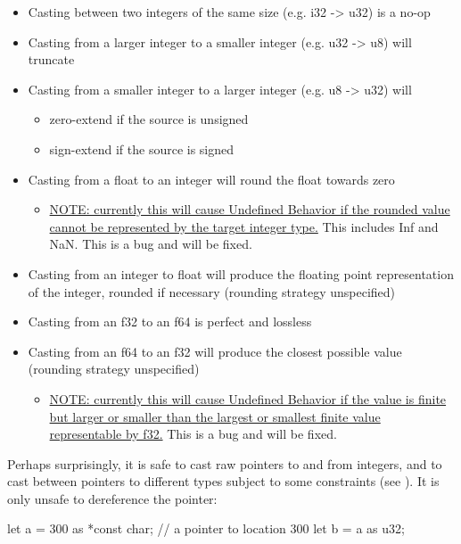 \begin{itemize}
  \item{Casting between two integers of the same size (e.g. i32 -> u32) is a no-op}
  \item{Casting from a larger integer to a smaller integer (e.g. u32 -> u8) will truncate}
  \item{Casting from a smaller integer to a larger integer (e.g. u8 -> u32) will}
  \begin{itemize}
    \item{zero-extend if the source is unsigned}
    \item{sign-extend if the source is signed}
  \end{itemize}
  \item{Casting from a float to an integer will round the float towards zero}
  \begin{itemize}
    \item{\href{https://github.com/rust-lang/rust/issues/10184}{NOTE: currently this will cause Undefined Behavior if the rounded 
        value cannot be represented by the target integer type.} This includes Inf and NaN. This is a bug and will be fixed.}
  \end{itemize}
  \item{Casting from an integer to float will produce the floating point representation of the integer, rounded if necessary 
      (rounding strategy unspecified)}
  \item{Casting from an f32 to an f64 is perfect and lossless}
  \item{Casting from an f64 to an f32 will produce the closest possible value (rounding strategy unspecified)}
  \begin{itemize}
    \item{\href{https://github.com/rust-lang/rust/issues/15536}{NOTE: currently this will cause Undefined Behavior if the value 
        is finite but larger or smaller than the largest or smallest finite value representable by f32.} This is a bug and will be fixed.}
  \end{itemize}
\end{itemize}


Perhaps surprisingly, it is safe to cast raw pointers to and from integers, and to cast between pointers to different types subject 
to some constraints (see ). It is only unsafe to dereference the pointer:

\begin{rustc}
let a = 300 as *const char; // a pointer to location 300
let b = a as u32;
\end{rustc}

